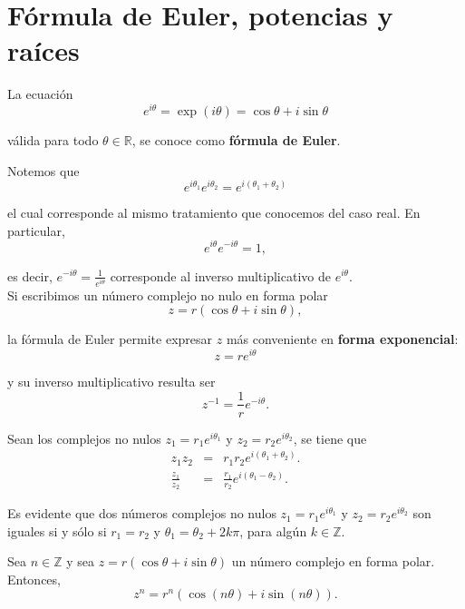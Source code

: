 \section{Fórmula de Euler, potencias y raíces}

La ecuación
$$e^{i\theta} = \exp(i\theta) = \cos\theta + i \sin \theta$$

válida para todo $\theta \in \mathbb{R}$, se conoce como \textbf{fórmula de Euler}. 

Notemos que
$$e^{i \theta_1} e^{i \theta_2} = e^{i(\theta_1 + \theta_2)}$$

el cual corresponde al mismo tratamiento que conocemos del caso real. En particular,
$$e^{i\theta} e^{-i\theta} = 1,$$

es decir, $e^{- i\theta} = \frac{1}{e^{i\theta}}$ corresponde al inverso multiplicativo de $e^{i\theta}$.
\\

Si escribimos un número complejo no nulo en forma polar
$$z = r (\cos\theta + i \sin\theta),$$

la fórmula de Euler permite expresar $z$ más conveniente en \textbf{forma exponencial}:
$$z = r e^{i\theta}$$

y su inverso multiplicativo resulta ser
$$z^{-1} = \frac{1}{r} e^{-i\theta}.$$

Sean los complejos no nulos $z_1 = r_1 e^{i\theta_1}$ y $z_2 = r_2 e^{i\theta_2}$, se tiene que
\begin{eqnarray*}
z_1z_2 &=& r_1r_2 e^{i(\theta_1 + \theta_2)}. \\
\frac{z_1}{z_2} &=& \frac{r_1}{r_2} e^{i(\theta_1 - \theta_2)}.
\end{eqnarray*}

Es evidente que dos números complejos no nulos $z_1 = r_1 e^{i\theta_1}$ y $z_2 = r_2 e^{i\theta_2}$ son iguales si y sólo si $r_1 = r_2$ y $\theta_1 = \theta_2 + 2k\pi$, para algún $k \in \mathbb{Z}$.

\begin{teorema}
Sea $n \in \mathbb{Z}$ y sea $z= r (\cos \theta + i \sin \theta)$ un número complejo en forma polar. Entonces,
$$z^n = r^n (\cos (n\theta) + i\sin(n\theta)).$$
\end{teorema}

